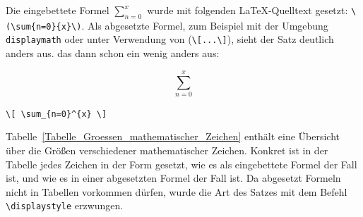 \documentclass[a4paper,10pt,twoside]{scrbook}
\begin{document}

Die eingebettete Formel \(\sum_{n=0}^{x}\) wurde mit folgenden 
\LaTeX-Quelltext gesetzt: \verb!\(\sum{n=0}{x}\)!. Als abgesetzte Formel, zum Beispiel mit der Umgebung
\verb!displaymath! oder unter Verwendung von (\verb!\[...\]!), sieht der Satz deutlich anders aus. 
das dann schon ein wenig anders aus:

\begin{minipage}[c]{.4\textwidth}
\vspace*{-5mm}
\[ \sum_{n=0}^{x} \]
\end{minipage}
\hfill
\begin{minipage}[c]{.58\textwidth}
\setlength{\parskip}{1em}
\verb!\[ \sum_{n=0}^{x} \] !
\end{minipage}

Tabelle~\ref{Tabelle_Groessen_mathematischer_Zeichen} enthält eine Übersicht über die 
Größen verschiedener mathematischer Zeichen. Konkret ist in der Tabelle jedes Zeichen in der
Form gesetzt, wie es als eingebettete Formel der Fall ist, und wie es in einer abgesetzten Formel 
der Fall ist. Da abgesetzt Formeln nicht in Tabellen vorkommen dürfen, wurde die Art des Satzes mit dem Befehl 
\verb!\displaystyle! erzwungen.

\end{document}
